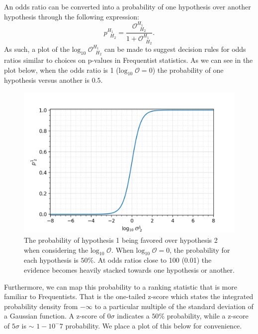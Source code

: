 An odds ratio can be converted into a probability of one hypothesis over another hypothesis through the following expression:
\begin{equation}\label{eqn:probability_odds_ratio}
    p^{H_1 \;\;}_{\;\;H_2} = \frac{\mathcal{O}^{H_1\;\;}_{\;\;H_2}}{1 + \mathcal{O}^{H_1\;\;}_{\;\;H_2}}.
\end{equation}
As such, a plot of the $\mathrm{log}_{10} \; \mathcal{O}^{H_1\;\;}_{\;\;H_2}$ can be made to suggest decision rules for odds ratios similar to choices on p-values in Frequentist statistics. As we can see in the plot below, when the odds ratio is 1 ($\mathrm{log}_{10} \; \mathcal{O} = 0$) the probability of one hypothesis versus another is $0.5$. 
\begin{figure}
  \includegraphics[width=\textwidth]{figs/chapter5/log10odds_probability.png}
  \caption{The probability of hypothesis 1 being favored over hypothesis 2 when considering the $\mathrm{log}_{10} \; \mathcal{O}$. When $\mathrm{log}_{10} \; \mathcal{O} = 0$, the probability for each hypothesis is $50\%$. At odds ratios close to 100 (0.01) the evidence becomes heavily stacked towards one hypothesis or another.}
  \label{fig:log10odds_v_probability}
\end{figure}
Furthermore, we can map this probability to a ranking statistic that is more familiar to Frequentists. That is the one-tailed z-score which states the integrated probability density from $-\infty$ to a particular multiple of the standard deviation of a Gaussian function. A z-score of $0 \sigma$ indicates a $50\%$ probability, while a z-score of $5 \sigma$ is $\sim$ $1-10^-7$ probability. We place a plot of this below for convenience.
